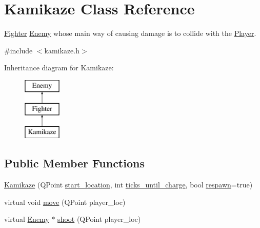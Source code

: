 \hypertarget{classKamikaze}{
\section{Kamikaze Class Reference}
\label{classKamikaze}
}


\hyperlink{classFighter}{Fighter} \hyperlink{classEnemy}{Enemy} whose main way of causing damage is to collide with the \hyperlink{classPlayer}{Player}.  




{\ttfamily \#include $<$kamikaze.h$>$}

Inheritance diagram for Kamikaze:\begin{figure}[H]
\begin{center}
\leavevmode
\includegraphics[height=3.000000cm]{classKamikaze}
\end{center}
\end{figure}
\subsection*{Public Member Functions}
\begin{DoxyCompactItemize}
\item 
\hyperlink{classKamikaze_a8fdfa9baea48a14d42067d72f8785b44}{Kamikaze} (QPoint \hyperlink{classKamikaze_ae4257ec55e8a232fa4f16802ce5f5361}{start\_\-location}, int \hyperlink{classKamikaze_a1daf6e11e123fb83099dca5832daf9ce}{ticks\_\-until\_\-charge}, bool \hyperlink{classKamikaze_aeb07c995727bc870195efb244c584239}{respawn}=true)
\item 
virtual void \hyperlink{classKamikaze_a41a0df84d6ebd9113c19fed5aa099ca2}{move} (QPoint player\_\-loc)
\item 
virtual \hyperlink{classEnemy}{Enemy} $\ast$ \hyperlink{classKamikaze_ae194f7e2fd550953fdaff15d91962d49}{shoot} (QPoint player\_\-loc)
\end{DoxyCompactItemize}
